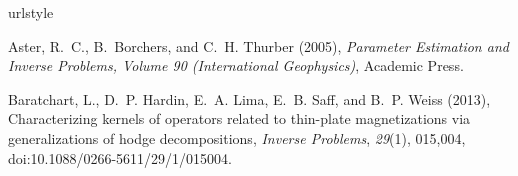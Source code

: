 \documentclass[galley,gc]{agutex}
\begin{document}
\begin{article}
%
%
%
%
%
%

%
%
%

%
%


%
%
%

\begin{thebibliography}{40}
\providecommand{\natexlab}[1]{#1}
\expandafter\ifx\csname urlstyle\endcsname\relax
  \providecommand{\doi}[1]{doi:\discretionary{}{}{}#1}\else
  \providecommand{\doi}{doi:\discretionary{}{}{}\begingroup
  \urlstyle{rm}\Url}\fi

Aster, R.~C., B.~Borchers, and C.~H. Thurber (2005), \textit{Parameter
  Estimation and Inverse Problems, Volume 90 (International Geophysics)},
  Academic Press.

Baratchart, L., D.~P. Hardin, E.~A. Lima, E.~B. Saff, and B.~P. Weiss (2013),
  Characterizing kernels of operators related to thin-plate magnetizations via
  generalizations of hodge decompositions, \textit{Inverse Problems},
  \textit{29}(1), 015,004, \doi{10.1088/0266-5611/29/1/015004}.


\end{thebibliography}
\end{article}
\end{document}
